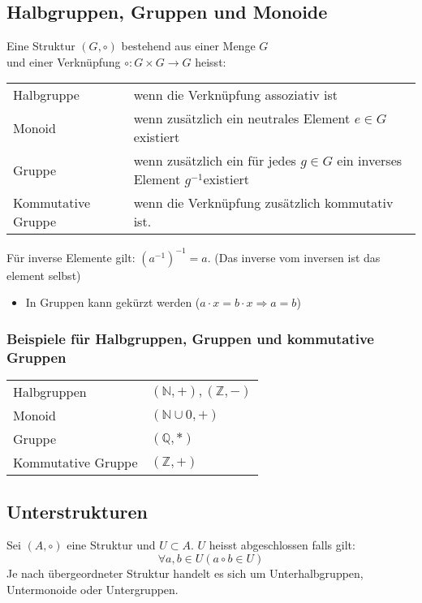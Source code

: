 \subsection{Halbgruppen, Gruppen und Monoide}
Eine Struktur $(G, \circ)$ bestehend aus einer Menge $G$\\
 und einer Verknüpfung $\circ: G \times G \rightarrow G$ heisst:
\settowidth{\MyLenA}{Kommutative Gruppe ~~}
\begin{tabular}{@{}p{\the\MyLenA}%
				@{}p{(\linewidth - \the\MyLenA)}}
	Halbgruppe & wenn die Verknüpfung assoziativ ist\\
	Monoid & wenn zusätzlich ein neutrales Element $e \in G$ existiert\\
	Gruppe & wenn zusätzlich ein für jedes $g \in G$ ein inverses Element $g^{-1}$existiert\\
	Kommutative Gruppe & wenn die Verknüpfung zusätzlich kommutativ ist.\\
\end{tabular}
Für inverse Elemente gilt: $(a^{-1})^{-1} = a$. (Das inverse vom inversen ist das element selbst)

\begin{itemize}
	\item In Gruppen kann gekürzt werden ($a \cdot x = b \cdot x \Rightarrow a = b$)
\end{itemize}

\subsubsection{Beispiele für Halbgruppen, Gruppen und kommutative Gruppen}
\settowidth{\MyLenA}{Kommutative Gruppe ~~}
\begin{tabular}{@{}p{\the\MyLenA}%
				@{}p{}}
	Halbgruppen & $(\mathbb{N}, +), (\mathbb{Z, -})$\\
	Monoid & $(\mathbb{N} \cup {0}, +)$\\
	Gruppe & $(\mathbb{Q}, *)$\\
	Kommutative Gruppe & $(\mathbb{Z}, +)$\\
\end{tabular}

\subsection{Unterstrukturen}
Sei $(A, \circ)$ eine Struktur und $U \subset A$. $U$ heisst abgeschlossen falls gilt:
	\begin{equation*}
		\forall a, b \in U (a \circ b \in U)
	\end{equation*}
Je nach übergeordneter Struktur handelt es sich um Unterhalbgruppen, Untermonoide oder Untergruppen.

